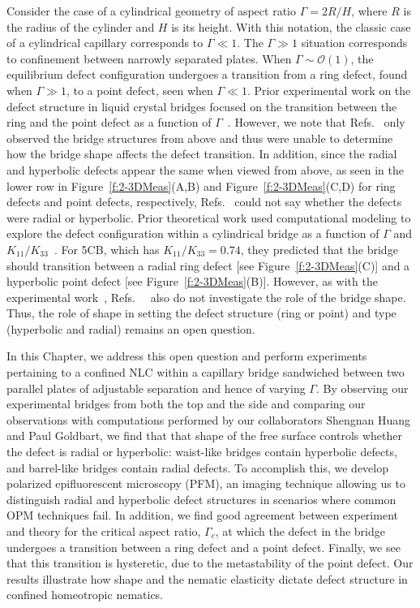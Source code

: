 Consider the case of a cylindrical geometry of aspect ratio $\Gamma = 2 R/H$, where $R$ is the radius of the cylinder and $H$ is its height.
With this notation, the classic case of a cylindrical capillary corresponds to $\Gamma \ll 1$. The $\Gamma \gg 1$ situation corresponds to confinement between narrowly separated plates.
When $\Gamma \sim \mathcal{O}\left( 1 \right)$, the equilibrium defect configuration undergoes a transition from a ring defect, found when $\Gamma \gg 1$, to a point defect, seen when $\Gamma \ll 1$.
Prior experimental work on the defect structure in liquid crystal bridges focused on the transition between the ring and the point defect as a function of $\Gamma$~\cite{RN139,RN147}.
However, we note that Refs.~\cite{RN139,RN147} only observed the bridge structures from above and thus were unable to determine how the bridge shape affects the defect transition.
In addition, since the radial and hyperbolic defects appear the same when viewed from above, as seen in the lower row in Figure~\ref{f:2-3DMeas}(A,B) and Figure~\ref{f:2-3DMeas}(C,D) for ring defects and point defects, respectively, Refs.~\cite{RN139,RN147} could not say whether the defects were radial or hyperbolic.
Prior theoretical work used computational modeling to explore the defect configuration within a cylindrical bridge as a function of $\Gamma$ and $K_{11}/K_{33}$~\cite{RN138,RN144}.
For 5CB, which has $K_{11}/K_{33} = 0.74$, they predicted that the bridge should transition between a radial ring defect [see Figure~\ref{f:2-3DMeas}(C)] and a hyperbolic point defect [see Figure~\ref{f:2-3DMeas}(B)].
However, as with the experimental work~\cite{RN139,RN147}, Refs.~~\cite{RN138,RN144} also do not investigate the role of the bridge shape.
Thus, the role of shape in setting the defect structure (ring or point) and type (hyperbolic and radial) remains an open question.

In this Chapter, we address this open question and perform experiments pertaining to a confined NLC within a capillary bridge sandwiched between two parallel plates of adjustable separation and hence of varying $\Gamma$.
By observing our experimental bridges from both the top and the side and comparing our observations with computations performed by our collaborators Shengnan Huang and Paul Goldbart, we find that that shape of the free surface controls whether the defect is radial or hyperbolic: waist-like bridges contain hyperbolic defects, and barrel-like bridges contain radial defects.
To accomplish this, we develop polarized epifluorescent microscopy (PFM), an imaging technique allowing us to distinguish radial and hyperbolic defect structures in scenarios where common OPM techniques fail.
In addition, we find good agreement between experiment and theory for the critical aspect ratio, $\Gamma_c$, at which the defect in the bridge undergoes a transition between a ring defect and a point defect.
Finally, we see that this transition is hysteretic, due to the metastability of the point defect.
Our results illustrate how shape and the nematic elasticity dictate defect structure in confined homeotropic nematics.




